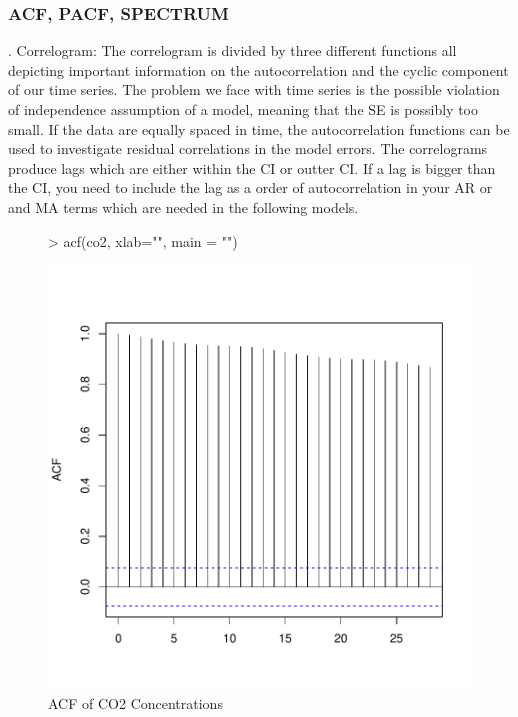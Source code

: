 \documentclass[11pt, a4paper]{article} %
\begin{document}
\subsubsection{ACF, PACF, SPECTRUM}
. Correlogram:  The correlogram is divided by three different functions all depicting important information on the autocorrelation and the cyclic component of our time series.  The problem we face with time series is the possible violation of independence assumption of a model, meaning that the SE is possibly too small. If the data are equally spaced in time,  the autocorrelation functions can be used to investigate residual  correlations in the model errors. The correlograms produce lags which are either within the CI or outter CI. If a lag is bigger than the CI, you need to include the lag as a order of autocorrelation in your AR or\- and MA terms which are needed in the following models. 


\begin{figure}[H]
\centering
\begin{Schunk}
\begin{Sinput}
> acf(co2, xlab="", main = "")
\end{Sinput}
\end{Schunk}
\includegraphics{alleselena-ACF_co2}
 \caption{ACF of CO2 Concentrations}
\label{correlogramlm}
\end{figure}
\end{document}
